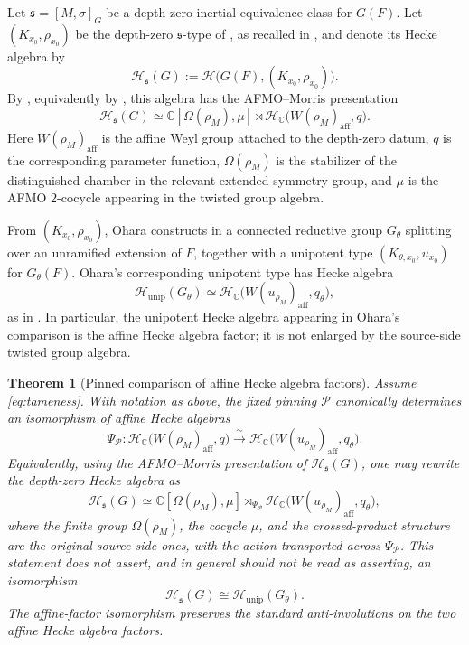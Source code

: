 \documentclass{amsart}
\theoremstyle{plain}
\numberwithin{equation}{section}
\newtheorem{theorem}{Theorem}[section]
\theoremstyle{definition}
\newcommand{\cP}{\mathcal{P}}
\newcommand{\cH}{\mathcal{H}}
\newcommand{\C}{\mathbb{C}}
\begin{document}
Let \(\mathfrak s=[M,\sigma]_G\) be a depth-zero inertial equivalence class for
\(G(F)\).  Let \((K_{x_0},\rho_{x_0})\) be the depth-zero \(\mathfrak s\)-type of
\cite{AFMO24a}, as recalled in \cite[\S4.2]{ohara2025}, and denote its Hecke
algebra by
\[
\cH_{\mathfrak s}(G)
:=
\cH\bigl(G(F),(K_{x_0},\rho_{x_0})\bigr).
\]
By \cite[Theorem~4.2.2]{ohara2025}, equivalently by
\cite[Theorem~5.3.6]{AFMO24a}, this algebra has the AFMO--Morris presentation
\begin{equation}\label{eq:AFMO-depth0-structure}
\cH_{\mathfrak s}(G)
\simeq
\C[\Omega(\rho_M),\mu]\rtimes
\cH_{\C}\!\bigl(W(\rho_M)_{\mathrm{aff}},q\bigr).
\end{equation}
Here \(W(\rho_M)_{\mathrm{aff}}\) is the affine Weyl group attached to the
depth-zero datum, \(q\) is the corresponding parameter function,
\(\Omega(\rho_M)\) is the stabilizer of the distinguished chamber in the relevant
extended symmetry group, and \(\mu\) is the AFMO \(2\)-cocycle appearing in the
twisted group algebra.

From \((K_{x_0},\rho_{x_0})\), Ohara constructs in \cite[\S4.3]{ohara2025} a
connected reductive group \(G_\theta\) splitting over an unramified extension of
\(F\), together with a unipotent type \((K_{\theta,x_0},u_{x_0})\) for
\(G_\theta(F)\).  Ohara's corresponding unipotent type has Hecke algebra
\begin{equation}\label{eq:AFMO-unip-structure}
\cH_{\mathrm{unip}}(G_\theta)
\simeq
\cH_{\C}\!\bigl(W(u_{\rho_M})_{\mathrm{aff}},q_\theta\bigr),
\end{equation}
as in \cite[Theorem~4.3.7]{ohara2025}.  In particular, the unipotent
Hecke algebra appearing in Ohara's comparison is the affine Hecke algebra
factor; it is not enlarged by the source-side twisted group algebra.

\begin{theorem}[Pinned comparison of affine Hecke algebra factors]
\label{thm:padic-depth0-to-unipotent-hecke}
Assume \eqref{eq:tameness}.  With notation as above, the fixed pinning \(\cP\)
canonically determines an isomorphism of affine Hecke algebras
\[
\Psi_{\cP}:
\cH_{\C}\!\bigl(W(\rho_M)_{\mathrm{aff}},q\bigr)
\xrightarrow{\ \sim\ }
\cH_{\C}\!\bigl(W(u_{\rho_M})_{\mathrm{aff}},q_\theta\bigr).
\]
Equivalently, using the AFMO--Morris presentation of \(\cH_{\mathfrak s}(G)\), one
may rewrite the depth-zero Hecke algebra as
\[
\cH_{\mathfrak s}(G)
\simeq
\C[\Omega(\rho_M),\mu]\rtimes_{\Psi_{\cP}}
\cH_{\C}\!\bigl(W(u_{\rho_M})_{\mathrm{aff}},q_\theta\bigr),
\]
where the finite group \(\Omega(\rho_M)\), the cocycle \(\mu\), and the crossed-product
structure are the original source-side ones, with the action transported across
\(\Psi_{\cP}\).  This statement does not assert, and in general should not be
read as asserting, an isomorphism
\[
\cH_{\mathfrak s}(G)
\cong
\cH_{\mathrm{unip}}(G_\theta).
\]
The affine-factor isomorphism preserves the standard anti-involutions on the two
affine Hecke algebra factors.
\end{theorem}
\end{document}
